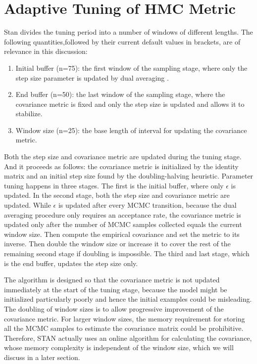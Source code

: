 \documentclass[]{report}
\begin{document}
\section{Adaptive Tuning of HMC Metric}
Stan divides the tuning period into a number of windows of different lengths. The following quantities,followed by their current default values in brackets, are of relevance in this discussion: 

\begin{enumerate}
\item Initial buffer (n=75): the first window of the sampling stage, where only the step size parameter is updated by dual averaging .

\item End buffer (n=50): the last window of the sampling stage, where the covariance metric is fixed and only the step size is updated and allows it to stabilize.

\item Window size (n=25): the base length of interval for updating the covariance metric. 
\end{enumerate}

Both the step size and covariance metric are updated during the tuning stage. And it proceeds as follows: the covariance metric is initialized by the identity matrix and an initial step size found by the doubling-halving heuristic. Parameter tuning happens in three stages. The first is the initial buffer, where only $\epsilon $ is updated. In the second stage, both the step size and covariance metric are updated. While $\epsilon$ is updated after every MCMC transition, because the dual averaging procedure only requires an acceptance rate, the covariance metric is updated only after the number of MCMC samples collected equals the current window size. Then compute the empirical covariance and set the metric to its inverse. Then double the window size or increase it to cover the rest of the remaining second stage if doubling is impossible. The third and last stage, which is the end buffer, updates the step size only. 

The algorithm is designed so that the covariance metric is not updated immediately at the start of the tuning stage, because the model might be initialized particularly poorly and hence the initial examples could be misleading. The doubling of window sizes is to allow progressive improvement of the covariance metric. For larger window sizes, the memory requirement for storing all the MCMC samples to estimate the covariance matrix could be prohibitive. Therefore, STAN actually uses an online algorithm for calculating the covariance, whose memory complexity is independent of the window size, which we will discuss in a later section.
\end{document}
